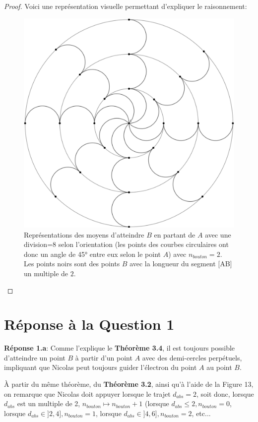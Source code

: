\documentclass{amsart}
\theoremstyle{definition}
\theoremstyle{remark}
\numberwithin{equation}{section}
\begin{document}
\begin{proof}
  Voici une représentation visuelle permettant d'expliquer le raisonnement:
  \begin{figure}[H]
    \centering
    \includegraphics[scale=0.27]{images/visualization.png}
    \caption{Représentations des moyens d'atteindre $B$ en partant de $A$ avec une division=8 selon l'orientation (les points des courbes circulaires ont donc un angle de 45° entre eux selon le point $A$) avec $n_{bouton}=2$.
      Les points noirs sont des points $B$ avec la longueur du segment [AB] un multiple de $2$.}
  \end{figure}
\end{proof}

\section{Réponse à la Question 1}

\textbf{Réponse 1.a}: Comme l'explique le \textbf{Théorème 3.4}, il est toujours possible d'atteindre un point $B$ à partir d'un point $A$ avec des demi-cercles perpétuels, impliquant que Nicolas peut toujours guider l'électron du point $A$ au point $B$.

À partir du même théorème, du \textbf{Théorème 3.2}, ainsi qu'à l'aide de la Figure 13, on remarque que Nicolas doit appuyer lorsque le trajet $d_{abs}=2$, soit donc, lorsque $d_{abs}$ est un multiple de 2, $n_{bouton}\longmapsto n_{bouton}+1$ (lorsque $d_{abs}\leq2, n_{bouton}=0$, lorsque $d_{abs}\in]2,4], n_{bouton}=1$, lorsque $d_{abs}\in]4,6], n_{bouton}=2$, etc...
\end{document}
